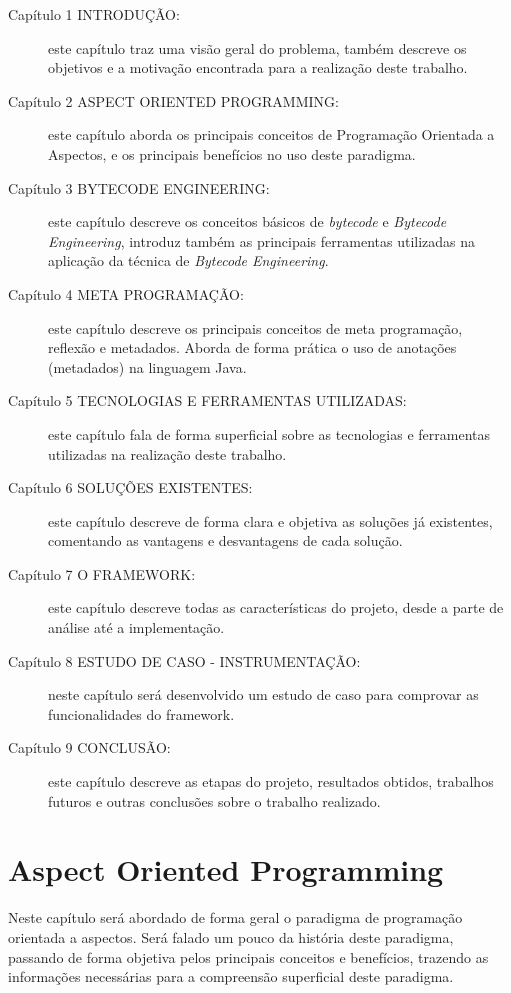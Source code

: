 \documentclass[tc,oneside]{iiufrgs}
\begin{document}
\begin{description}
\item [Capítulo 1 INTRODUÇÃO:] este capítulo traz uma visão geral do problema, também descreve os objetivos e a motivação encontrada para a realização deste trabalho.
\item [Capítulo 2 ASPECT ORIENTED PROGRAMMING:] este capítulo aborda os principais conceitos de Programação Orientada a Aspectos, e os principais benefícios no uso deste paradigma.
\item [Capítulo 3 BYTECODE ENGINEERING:] este capítulo descreve os conceitos básicos de \textit{bytecode} e \textit{Bytecode Engineering}, introduz também as principais ferramentas utilizadas na aplicação da técnica de \textit{Bytecode Engineering}.
\item [Capítulo 4 META PROGRAMAÇÃO:] este capítulo descreve os principais conceitos de meta programação, reflexão e metadados. Aborda de forma prática o uso de anotações (metadados) na linguagem Java.
\item [Capítulo 5 TECNOLOGIAS E FERRAMENTAS UTILIZADAS:] este capítulo fala de forma superficial sobre as tecnologias e ferramentas utilizadas na realização deste trabalho.
\item [Capítulo 6 SOLUÇÕES EXISTENTES:] este capítulo descreve de forma clara e objetiva as soluções já existentes, comentando as vantagens e desvantagens de cada solução.
\item [Capítulo 7 O FRAMEWORK:] este capítulo descreve todas as características do projeto, desde a parte de análise até a implementação.
\item [Capítulo 8 ESTUDO DE CASO - INSTRUMENTAÇÃO:] neste capítulo será desenvolvido um estudo de caso para comprovar as funcionalidades do framework.
\item [Capítulo 9 CONCLUSÃO:] este capítulo descreve as etapas do projeto, resultados obtidos, trabalhos futuros e outras conclusões sobre o trabalho realizado. 
\end{description}
 
\chapter{Aspect Oriented Programming}
Neste capítulo será abordado de forma geral o paradigma de programação orientada a aspectos. Será falado um pouco da história deste paradigma, passando de forma objetiva pelos principais conceitos e benefícios, trazendo as informações necessárias para a compreensão superficial deste paradigma.
\end{document}
